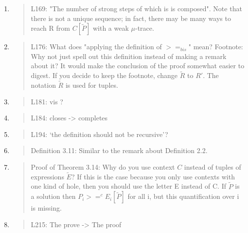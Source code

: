 \begin{enumerate}
\item \begin{quote}
    L169: "The number of strong steps of which is is composed". Note
    that there is not a unique sequence; in fact, there may be many
    ways to reach R from $C[\tilde{P}]$ with a weak $\mu$-trace.
  \end{quote}

\item \begin{quote}
    L176: What does "applying the definition of $>=_{bis}$" mean?
    Footnote: Why not just spell out this definition instead of making a remark about it?  It would make the conclusion of the proof somewhat easier to digest. If you decide to keep the footnote, change $\tilde{R}$ to $R'$. The notation $\tilde{R}$ is used for tuples.
  \end{quote}

\item \begin{quote}
    L181: vis ?
  \end{quote}

\item \begin{quote}
    L184: closes -> completes
  \end{quote}

\item \begin{quote}
    L194: ‘the definition should not be recursive’?
  \end{quote}

\item \begin{quote}
    Definition 3.11: Similar to the remark about Definition 2.2.
  \end{quote}

\item \begin{quote}
    Proof of Theorem 3.14: Why do you use context $C$ instead of tuples of expressions $\tilde{E}$?
    If this is the case because you only use contexts with one kind of hole, then you should use the letter
    E instead of C.
    If $\tilde{P}$ is a solution then $P_i >=^c E_i[\tilde{P}]$ for all i, but this quantification over i is missing.
  \end{quote}

\item \begin{quote}
    L215: The prove -> The proof
  \end{quote}


\end{enumerate}
